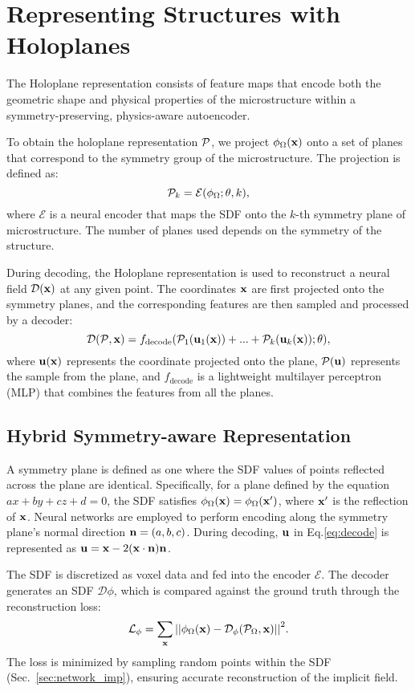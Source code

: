 
\section{Representing Structures with Holoplanes}
\label{sec:holoplane}
The Holoplane representation consists of feature maps that encode both the geometric shape and physical properties of the microstructure within a symmetry-preserving, physics-aware autoencoder.

To obtain the holoplane representation $\mathcal{P}$, we project $\phi_\Omega(\mathbf{x})$ onto a set of planes that correspond to the symmetry group of the microstructure. 
The projection is defined as:
\begin{equation}
    \mathcal{P}_k=\mathcal{E}(\phi_\Omega;\theta,k), 
\end{equation}
where $\mathcal{E}$ is a neural encoder that maps the SDF onto the $k$-th symmetry plane of microstructure. 
The number of planes used depends on the symmetry of the structure. 

During decoding, the Holoplane representation is used to reconstruct a neural field $\mathcal{D}(\mathbf{x})$ at any given point. 
The coordinates $\mathbf{x}$ are first projected onto the symmetry planes, and the corresponding features are then sampled and processed by a decoder:
\begin{equation}
\label{eq:decode}
    \mathcal{D}(\mathcal{P}, \mathbf{x}) = f_{\text{decode}}(\mathcal{P}_1(\mathbf{u}_1(\mathbf{x})) + ... + \mathcal{P}_k(\mathbf{u}_k(\mathbf{x})); \theta),
\end{equation}
where $\mathbf{u}(\mathbf{x})$ represents the coordinate projected onto the plane, $\mathcal{P}(\mathbf{u})$ represents the sample from the plane, and $f_\text{decode}$ is a lightweight multilayer perceptron (MLP) that combines the features from all the planes.

\subsection{Hybrid Symmetry-aware Representation}
\label{sec:sym_enc}
A symmetry plane is defined as one where the SDF values of points reflected across the plane are identical. 
Specifically, for a plane defined by the equation $ax+by+cz+d=0$, the SDF satisfies $\phi_\Omega(\mathbf{x})=\phi_\Omega(\mathbf{x}')$, where $\mathbf{x}'$ is the reflection of $\mathbf{x}$.
Neural networks are employed to perform encoding along the symmetry plane's normal direction $\mathbf{n} = (a, b, c)$.
During decoding, $\mathbf{u}$ in Eq.\ref{eq:decode} is represented as $\mathbf{u}=\mathbf{x}-2(\mathbf{x}\cdot\mathbf{n})\mathbf{n}$.

The SDF is discretized as voxel data and fed into the encoder $\mathcal{E}$.
The decoder generates an SDF $\mathcal{D}\phi$, which is compared against the ground truth through the reconstruction loss:
\begin{equation}
\label{eq:rec}
    \mathcal{L}_{\phi}=\sum_{\mathbf{x}}{\left|\left|\phi_\Omega(\mathbf{x}) - \mathcal{D}_\phi(\mathcal{P}_{\Omega}, \mathbf{x})\right|\right|}^2.
\end{equation}
The loss is minimized by sampling random points within the SDF (Sec.~\ref{sec:network_imp}), ensuring accurate reconstruction of the implicit field.

